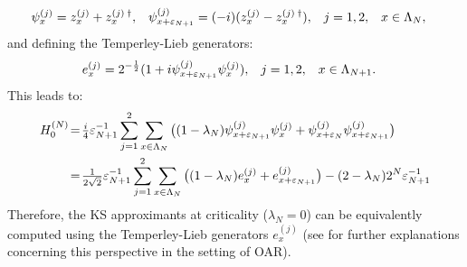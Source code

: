 \documentclass[a4paper, 11pt]{article}
\DeclareMathOperator{\1}{\mathds{1}}
\begin{document}
\begin{align}
\label{eq:majising}
\psi^{(j)}_{x} & = z^{(j)}_{x}+z^{(j)\!\ \dag}_{x}, & \psi^{(j)}_{x+\varepsilon_{N+1}} & = (-i)(z^{(j)}_{x}-z^{(j)\!\ \dag}_{x}), & j & = 1,2, & x & \in\Lambda_{N},
\end{align}
and defining the Temperley-Lieb generators:
\begin{align}
\label{eq:tlgen}
e^{(j)}_{x} & = 2^{-\frac{1}{2}}(1+i\psi^{(j)}_{x+\varepsilon_{N+1}}\psi^{(j)}_{x}), & j & = 1,2, & x & \in\Lambda_{N+1}.
\end{align}
This leads to:
\begin{align}
\label{eq:isingham3}
H^{(N)}_{0} & \!=\! \tfrac{i}{4}\vep_{N+1}^{-1}\sum_{j=1}^{2}\sum_{x\in\Lambda_{N}}\big((1-\lambda_{N})\psi^{(j)}_{x+\vep_{N+1}}\psi^{(j)}_{x}+\psi^{(j)}_{x+\vep_{N}}\psi^{(j)}_{x+\vep_{N+1}}\big) \\ \nonumber
& \!=\! \tfrac{1}{2\sqrt{2}}\vep_{N+1}^{-1}\sum_{j=1}^{2}\sum_{x\in\Lambda_{N}}\big((1-\lambda_{N})e^{(j)}_{x} + e^{(j)}_{x+\vep_{N+1}}\big) - (2-\lambda_{N})2^{N}\vep_{N+1}^{-1}
\end{align}
Therefore, the KS approximants at criticality ($\lambda_{N}=0$) can be equivalently computed using the Temperley-Lieb generators $e^{(j)}_{x}$ (see \cite{StottmeisterAnyonBraidingAnd} for further explanations concerning this perspective in the setting of OAR).
\end{document}
